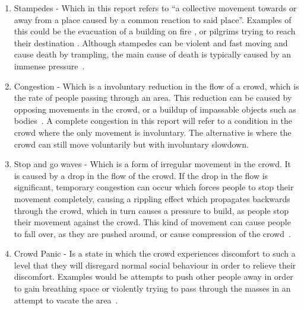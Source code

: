 \begin{enumerate}
    \item Stampedes - Which in this report refers to \enquote{a collective movement towards or away from a place caused by a common reaction to said place}. Examples of this could be the evacuation of a building on fire \cite{website:Wikipedia-stationclubfire}, or pilgrims trying to reach their destination \cite{website:Wikipedia-minastampede}. Although stampedes can be violent and fast moving and cause death by trampling, the main cause of death is  typically caused by an immense pressure~\cite{fruincauses}.
    
    \item Congestion - Which is a involuntary reduction in the flow of a crowd, which is the rate of people passing through an area. This reduction can be caused by opposing movements in the crowd, or a buildup of impassable objects such as bodies~\cite{ website:Wikipedia-stationclubfire,website:Wikipedia-meccatunnel}. A complete congestion in this report will refer to a condition in the crowd where the only movement is involuntary. The alternative is where the crowd can still move voluntarily but with involuntary slowdown.
    
    
    \item Stop and go waves - Which is a form of irregular movement in the crowd. It is caused by a drop in the flow of the crowd. If the drop in the flow is significant, temporary congestion can occur which forces people to stop their movement completely, causing a rippling effect which propagates backwards through the crowd, which in turn causes a pressure to build, as people stop their movement against the crowd. This kind of movement can cause people to fall over, as they are pushed around, or cause compression of the crowd~\cite{empircalstudy,videoanalysis}.
    
    \item Crowd Panic - Is a state in which the crowd experiences discomfort to such a level that they will disregard normal social behaviour in order to relieve their discomfort. Examples would be attempts to push other people away in order to gain breathing space or violently trying to pass through the masses in an attempt to vacate the area~\cite{empircalstudy}.
\end{enumerate}

